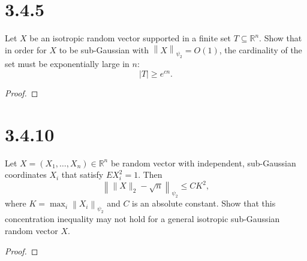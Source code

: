 \documentclass[11pt,letterpaper]{report}
\newcommand{\reals}{\mathbb{R}}
\newcommand{\subg}[1]{\left\|{#1}\right\|_{\psi_2}}
\begin{document}
\section*{3.4.5}
Let $X$ be an isotropic random vector supported in a finite set $T\subseteq \reals^n$. Show that in order for $X$ to be sub-Gaussian with $\subg{X}= O(1)$, the cardinality of the set must be exponentially large in $n$:
\[
|T|\geq e^{cn}.
\]
\begin{proof}
	
\end{proof}










\section*{3.4.10}
Let $X = (X_1, \ldots, X_n)\in \reals^n$ be random vector with independent, sub-Gaussian coordinates $X_i$ that satisfy $EX_i^2=1$. Then
\[
\subg{\|X\|_2 - \sqrt{n}}\leq CK^2,
\]
where $K = \max_i\subg{X_i}$ and $C$ is an absolute constant. Show that this concentration inequality may not hold for a general isotropic sub-Gaussian random vector $X$.
\begin{proof}
	
\end{proof}
\end{document}
